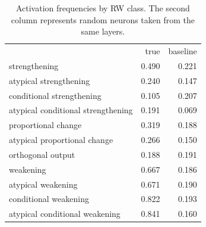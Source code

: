 \begin{table}
\caption{
                Activation frequencies by RW class.
                The second column represents random neurons taken from the same layers.
                }
\label{tab:summary}
\begin{tabular}{lrr}
 & true & baseline \\
strengthening & 0.490 & 0.221 \\
atypical strengthening & 0.240 & 0.147 \\
conditional strengthening & 0.105 & 0.207 \\
atypical conditional strengthening & 0.191 & 0.069 \\
proportional change & 0.319 & 0.188 \\
atypical proportional change & 0.266 & 0.150 \\
orthogonal output & 0.188 & 0.191 \\
weakening & 0.667 & 0.186 \\
atypical weakening & 0.671 & 0.190 \\
conditional weakening & 0.822 & 0.193 \\
atypical conditional weakening & 0.841 & 0.160 \\
\end{tabular}
\end{table}
